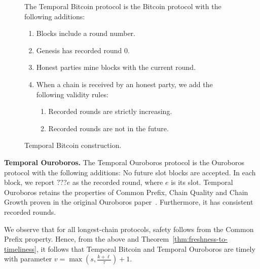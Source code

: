 \begin{figure}
  The Temporal Bitcoin protocol is the Bitcoin protocol with
  the following additions:

  \begin{enumerate}
    \item Blocks include a round number.
    \item Genesis has recorded round $0$.
    \item Honest parties mine blocks with the current round.
    \item When a chain is received by an honest party, we add the following validity rules:
          \begin{enumerate}
            \item Recorded rounds are strictly increasing.
            \item Recorded rounds are not in the future.
          \end{enumerate}
  \end{enumerate}
  \caption{Temporal Bitcoin construction.}
  \label{fig.temporal-backbone}
\end{figure}

\noindent
\textbf{Temporal Ouroboros.}
The Temporal Ouroboros protocol is the Ouroboros protocol with
the following additions: No future slot blocks are accepted.
In each block, we report $??? e$  as the recorded round, where $e$ is its slot.
Temporal Ouroboros retains the properties of Common Prefix,
Chain Quality and Chain Growth proven in the original Ouroboros paper~\cite{ouroboros}.
Furthermore, it has consistent recorded rounds.

We observe that for all longest-chain protocols, safety follows from the
Common Prefix property. Hence, from the above and Theorem~\ref{thm:freshness-to-timeliness},
it follows that Temporal Bitcoin and
Temporal Ouroboros are timely with parameter $v = \max(s, \frac{k + \ell}{\tau}) + 1$.


